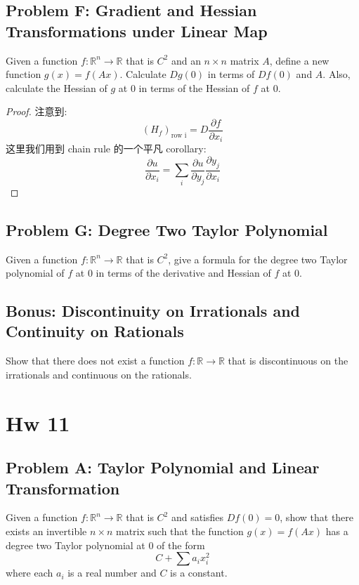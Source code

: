 \documentclass[lang=cn,11pt]{template}
\begin{document}
\section*{Problem F: Gradient and Hessian Transformations under Linear Map}
Given a function \( f : \mathbb{R}^n \rightarrow \mathbb{R} \) that is \( C^2 \) and an \( n \times n \) matrix \( A \), define a new function \( g(x) = f(Ax) \). Calculate \( Dg(0) \) in terms of \( Df(0) \) and \( A \). Also, calculate the Hessian of \( g \) at 0 in terms of the Hessian of \( f \) at 0.
\begin{proof}
    注意到:
    $$
    (H_f)_{\text{row i}} = D \frac{\partial f}{\partial x_i}
    $$
    这里我们用到 chain rule 的一个平凡 corollary:
    $$
    \frac{\partial u}{\partial x_i} = \sum_i \frac{\partial u}{\partial y_j} \frac{\partial y_j}{\partial x_i}
    $$
\end{proof}

\section*{Problem G: Degree Two Taylor Polynomial}
Given a function \( f : \mathbb{R}^n \rightarrow \mathbb{R} \) that is \( C^2 \), give a formula for the degree two Taylor polynomial of \( f \) at 0 in terms of the derivative and Hessian of \( f \) at 0.



\section*{Bonus: Discontinuity on Irrationals and Continuity on Rationals}
Show that there does not exist a function \( f : \mathbb{R} \rightarrow \mathbb{R} \) that is discontinuous on the irrationals and continuous on the rationals.






\chapter{Hw 11}

\section*{Problem A: Taylor Polynomial and Linear Transformation}
Given a function \( f : \mathbb{R}^n \rightarrow \mathbb{R} \) that is \( C^2 \) and satisfies \( Df(0) = 0 \), show that there exists an invertible \( n \times n \) matrix such that the function \( g(x) = f(Ax) \) has a degree two Taylor polynomial at 0 of the form
\[
C + \sum a_i x_i^2
\]
where each \( a_i \) is a real number and \( C \) is a constant.
\end{document}

